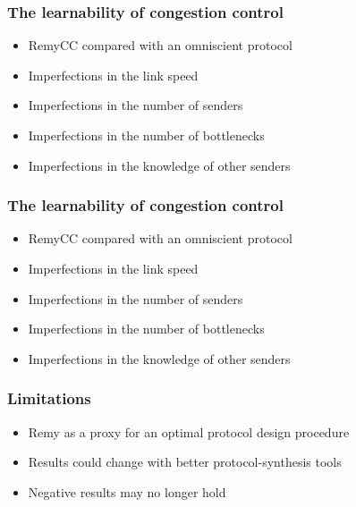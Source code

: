 \documentclass[svgnames]{beamer}
\begin{document}
\begin{Large}


\begin{frame}
\frametitle{The learnability of congestion control}
\begin{itemize}
\item RemyCC compared with an omniscient protocol
\item Imperfections in the link speed
\item Imperfections in the number of senders
\item Imperfections in the number of bottlenecks
\item Imperfections in the knowledge of other senders
\end{itemize}
\end{frame}

 

\begin{frame}
\frametitle{The learnability of congestion control}
\begin{itemize}
\item RemyCC compared with an omniscient protocol
\item Imperfections in the link speed
\item Imperfections in the number of senders
\item Imperfections in the number of bottlenecks
\item Imperfections in the knowledge of other senders
\end{itemize}
\end{frame}



\begin{frame}
\frametitle{Limitations}
\begin{itemize}
\item<2-> Remy as a proxy for an optimal protocol design procedure
\item<3-> Results could change with better protocol-synthesis tools
\item<4-> Negative results may no longer hold
\end{itemize}
\end{frame}


\end{Large}
\end{document}

